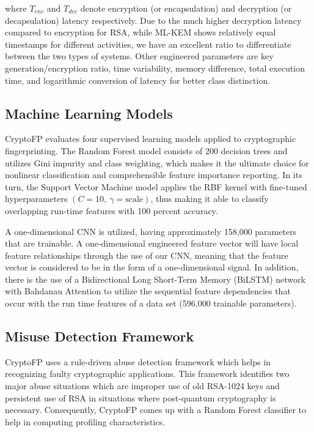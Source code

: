 \documentclass[conference]{IEEEtran}
\begin{document}
where $T_{enc}$ and $T_{dec}$ denote encryption (or encapsulation) and decryption (or decapsulation) latency respectively. Due to the much higher decryption latency compared to encryption for RSA, while ML-KEM shows relatively equal timestamps for different activities, we have an excellent ratio to differentiate between the two types of systems. Other engineered parameters are key generation/encryption ratio, time variability, memory difference, total execution time, and logarithmic conversion of latency for better class distinction.

\subsection{Machine Learning Models}

CryptoFP evaluates four supervised learning models applied to cryptographic fingerprinting. The Random Forest model consists of 200 decision trees and utilizes Gini impurity and class weighting, which makes it the ultimate choice for nonlinear classification and comprehensible feature importance reporting. In its turn, the Support Vector Machine model applies the RBF kernel with fine-tuned hyperparameters $(C = 10,\ \gamma = \mathrm{scale})$, thus making it able to classify overlapping run-time features with 100 percent accuracy.

A one-dimensional CNN is utilized, having approximately 158,000 parameters that are trainable. A one-dimensional engineered feature vector will have local feature relationships through the use of our CNN, meaning that the feature vector is considered to be in the form of a one-dimensional signal. In addition, there is the use of a Bidirectional Long Short-Term Memory (BiLSTM) network with Bahdanau Attention to utilize the sequential feature dependencies that occur with the run time features of a data set (596,000 trainable parameters).

\subsection{Misuse Detection Framework}

CryptoFP uses a rule-driven abuse detection framework which helps in recognizing faulty cryptographic applications. This framework identifies two major abuse situations which are improper use of old RSA-1024 keys and persistent use of RSA in situations where post-quantum cryptography is necessary. Consequently, CryptoFP comes up with a Random Forest classifier to help in computing profiling characteristics.
\end{document}
